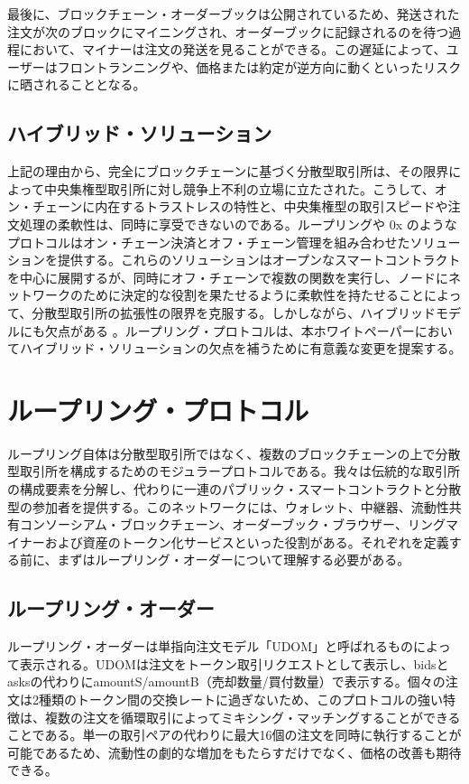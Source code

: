 \documentclass{article}
\begin{document}
\begin{multicols}{2}
最後に、ブロックチェーン・オーダーブックは公開されているため、発送された注文が次のブロックにマイニングされ、オーダーブックに記録されるのを待つ過程において、マイナーは注文の発送を見ることができる。この遅延によって、ユーザーはフロントランニングや、価格または約定が逆方向に動くといったリスクに晒されることとなる。


\subsection{ハイブリッド・ソリューション}
上記の理由から、完全にブロックチェーンに基づく分散型取引所は、その限界によって中央集権型取引所に対し競争上不利の立場に立たされた。こうして、オン・チェーンに内在するトラストレスの特性と、中央集権型の取引スピードや注文処理の柔軟性は、同時に享受できないのである。ループリングや 0x \cite{warren20170x} のようなプロトコルはオン・チェーン決済とオフ・チェーン管理を組み合わせたソリューションを提供する。これらのソリューションはオープンなスマートコントラクトを中心に展開するが、同時にオフ・チェーンで複数の関数を実行し、ノードにネットワークのために決定的な役割を果たせるように柔軟性を持たせることによって、分散型取引所の拡張性の限界を克服する。しかしながら、ハイブリッドモデルにも欠点がある \cite{costofdecent}。ループリング・プロトコルは、本ホワイトペーパーにおいてハイブリッド・ソリューションの欠点を補うために有意義な変更を提案する。

\section{ループリング・プロトコル\label{sec:loopring_protocol}}
ループリング自体は分散型取引所ではなく、複数のブロックチェーンの上で分散型取引所を構成するためのモジュラープロトコルである。我々は伝統的な取引所の構成要素を分解し、代わりに一連のパブリック・スマートコントラクトと分散型の参加者を提供する。このネットワークには、ウォレット、中継器、流動性共有コンソーシアム・ブロックチェーン、オーダーブック・ブラウザー、リングマイナーおよび資産のトークン化サービスといった役割がある。それぞれを定義する前に、まずはループリング・オーダーについて理解する必要がある。

\subsection{ループリング・オーダー\label{sec:order_ring}}
ループリング・オーダーは単指向注文モデル「UDOM」\cite{coinport2014udom}と呼ばれるものによって表示される。UDOMは注文をトークン取引リクエストとして表示し、bidsとasksの代わりにamountS/amountB（売却数量/買付数量）で表示する。個々の注文は2種類のトークン間の交換レートに過ぎないため、このプロトコルの強い特徴は、複数の注文を循環取引によってミキシング・マッチングすることができることである。単一の取引ペアの代わりに最大16個の注文を同時に執行することが可能であるため、流動性の劇的な増加をもたらすだけでなく、価格の改善も期待できる。
 


\end{multicols}
\end{document}
